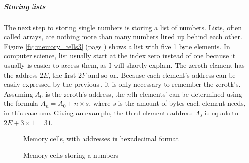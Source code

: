 \documentclass[10pt,a4paper,titlepage]{article}
\begin{document}
	\subparagraph{Storing lists}
	The next step to storing single numbers is storing a list of numbers. Lists, often called arrays, are nothing more than many numbers lined up behind each other. Figure \ref{fig:memory_cells3} (page \pageref{fig:memory_cells3}) shows a list with five 1 byte elements. In computer science, list usually start at the index zero instead of one because it usually is easier to access them, as I will shortly explain. The zeroth element has the address \(2E\), the first \(2F\) and so on. Because each element's address can be easily expressed by the previous', it is only necessary to remember the zeroth's. Assuming \(A_{0}\) is the zeroth's address, the \(n\)th elements' can be determined using the formula \(A_{n}=A_{0} + n \times s\), where \(s\) is the amount of bytes each element needs, in this case one. Giving an example, the third elements address \(A_{3}\) is equals to \(2E + 3 \times 1 = 31\).
	\cite{howstuffworks}
	\begin{figure}
		\centering
		\caption{Memory cells, with addresses in hexadecimal format}
		\label{fig:memory_cells1}
	\end{figure}
	
	\begin{figure}
		\centering
		\caption{Memory cells storing a numbers}
		\label{fig:memory_cells2}
	\end{figure}
	
\end{document}
